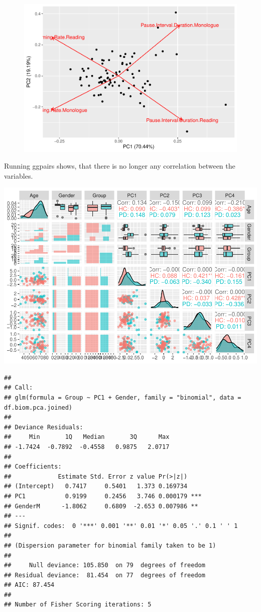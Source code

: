 \documentclass[
  english,
  doc,floatsintext]{apa6}
\begin{document}
\begin{figure}

{\centering \includegraphics{dap_report_anja_probst_files/figure-latex/pca-loadings-1} 

}

\caption{ }\label{fig:pca-loadings}
\end{figure}

Running ggpairs shows, that there is no longer any correlation between the variables.

\includegraphics{dap_report_anja_probst_files/figure-latex/check for removal of correlations-1.pdf}

\begin{verbatim}
## 
## Call:
## glm(formula = Group ~ PC1 + Gender, family = "binomial", data = df.biom.pca.joined)
## 
## Deviance Residuals: 
##     Min       1Q   Median       3Q      Max  
## -1.7424  -0.7892  -0.4558   0.9875   2.0717  
## 
## Coefficients:
##             Estimate Std. Error z value Pr(>|z|)    
## (Intercept)   0.7417     0.5401   1.373 0.169734    
## PC1           0.9199     0.2456   3.746 0.000179 ***
## GenderM      -1.8062     0.6809  -2.653 0.007986 ** 
## ---
## Signif. codes:  0 '***' 0.001 '**' 0.01 '*' 0.05 '.' 0.1 ' ' 1
## 
## (Dispersion parameter for binomial family taken to be 1)
## 
##     Null deviance: 105.850  on 79  degrees of freedom
## Residual deviance:  81.454  on 77  degrees of freedom
## AIC: 87.454
## 
## Number of Fisher Scoring iterations: 5
\end{verbatim}
\end{document}
